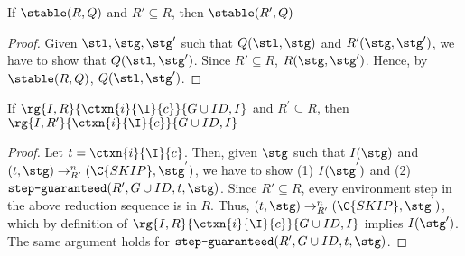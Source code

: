 %

\begin{lemma}
If $\stable(R, Q)$ and $R' \subseteq R$, then $\stable(R', Q)$
\end{lemma}
\begin{proof}
Given $\stl, \stg, \stg'$ such that $Q(\stl, \stg)$ and $R'(\stg, \stg')$, we have to show that $Q(\stl, \stg')$. Since $R' \subseteq R$, $R(\stg, \stg')$. Hence, by $\stable(R,Q)$, $Q(\stl, \stg')$.
\end{proof}

\begin{lemma}
If $\rg{I,R}{\ctxn{i}{\I}{c}}{G \cup ID,I}$ and $R^{'} \subseteq R$, then $\rg{I,R'}{\ctxn{i}{\I}{c}}{G \cup ID,I}$
\end{lemma}
\begin{proof}
Let $t = \ctxn{i}{\I}{c}$. Then, given $\stg$ such that $I(\stg)$ and $(t, \stg) \rightarrow_{R'}^{n} (\C{SKIP}, \stg^{'})$, we have to show (1) $I(\stg^{'})$ and (2) $\texttt{step-guaranteed}(R', G \cup ID, t, \stg)$. Since $R' \subseteq R$, every environment step in the above reduction sequence is in $R$. Thus,  $(t, \stg) \rightarrow_{R'}^{n} (\C{SKIP}, \stg^{'})$, which by definition of $\rg{I,R}{\ctxn{i}{\I}{c}}{G \cup ID,I}$ implies $I(\stg')$. The same argument holds for $\texttt{step-guaranteed}(R', G \cup ID, t, \stg)$.
\end{proof}

